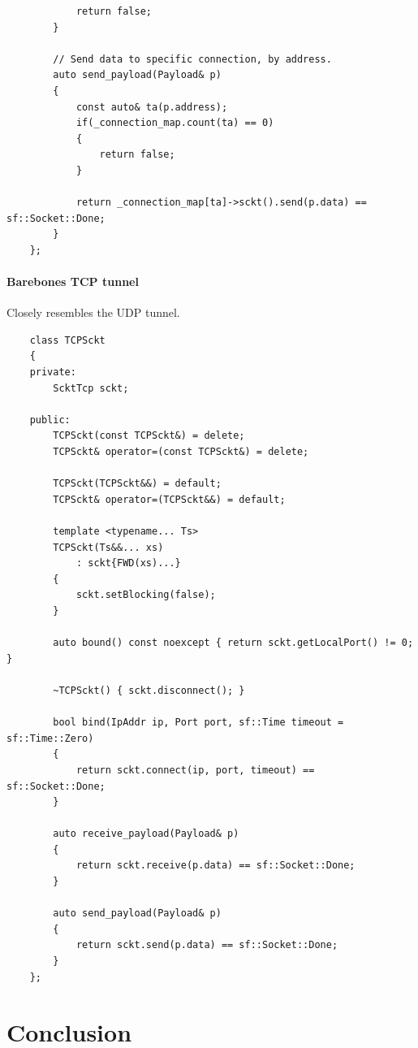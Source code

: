 \documentclass[11pt]{report}
\newcommand{\+}{\discretionary{\mbox{\scriptsize$\hookleftarrow$}}{}{}}
\begin{document}
\begin{verbatim}
            return false;
        }

        // Send data to specific connection, by address.
        auto send_payload(Payload& p)
        {
            const auto& ta(p.address);
            if(_connection_map.count(ta) == 0)
            {    
                return false;
            }

            return _connection_map[ta]->sckt().send(p.data) == sf::Socket::Done;
        }
    };
\end{verbatim}

        \subsection{Barebones TCP tunnel}   

        Closely resembles the UDP tunnel.
        
\begin{verbatim}
    class TCPSckt
    {
    private:
        ScktTcp sckt;

    public:
        TCPSckt(const TCPSckt&) = delete;
        TCPSckt& operator=(const TCPSckt&) = delete;

        TCPSckt(TCPSckt&&) = default;
        TCPSckt& operator=(TCPSckt&&) = default;

        template <typename... Ts>
        TCPSckt(Ts&&... xs)
            : sckt{FWD(xs)...}
        {
            sckt.setBlocking(false);
        }

        auto bound() const noexcept { return sckt.getLocalPort() != 0; }

        ~TCPSckt() { sckt.disconnect(); }

        bool bind(IpAddr ip, Port port, sf::Time timeout = sf::Time::Zero)
        {
            return sckt.connect(ip, port, timeout) == sf::Socket::Done;
        }

        auto receive_payload(Payload& p)
        {
            return sckt.receive(p.data) == sf::Socket::Done;
        }

        auto send_payload(Payload& p)
        {
            return sckt.send(p.data) == sf::Socket::Done;
        }
    };
\end{verbatim}



\part{Conclusion}
\end{document}
